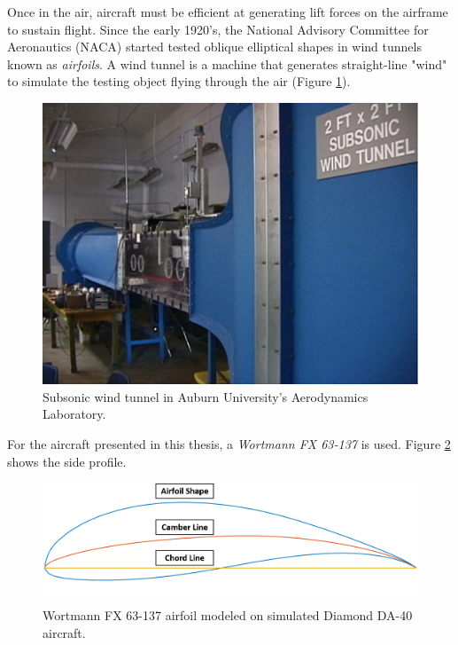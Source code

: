 \documentclass[../chapter_2.tex]{subfiles}
\begin{document}
Once in the air, aircraft must be efficient at generating lift forces on the airframe to sustain flight. Since the early 1920's, the National Advisory Committee for Aeronautics (NACA) started tested oblique elliptical shapes in wind tunnels known as \textit{airfoils}. A wind tunnel is a machine that generates straight-line "wind" to simulate the testing object flying through the air (Figure \ref{fig:windtunnel}).

\begin{figure}[!ht]
        \centering
    \includegraphics[width=.75\linewidth]{../../Figures/opencircuitwindtunnel.jpg}
    \caption{Subsonic wind tunnel in Auburn University's Aerodynamics Laboratory.}
    \label{fig:windtunnel}
\end{figure}

For the aircraft presented in this thesis, a \textit{Wortmann FX 63-137} is used. Figure \ref{fig:airfoil} shows the side profile.

\begin{figure}[!ht]
        \centering
    \includegraphics[width=\linewidth]{../../Figures/da40airfoil.png}
    \caption{Wortmann FX 63-137 airfoil modeled on simulated Diamond DA-40 aircraft.}
    \label{fig:airfoil}
\end{figure}
\end{document}
